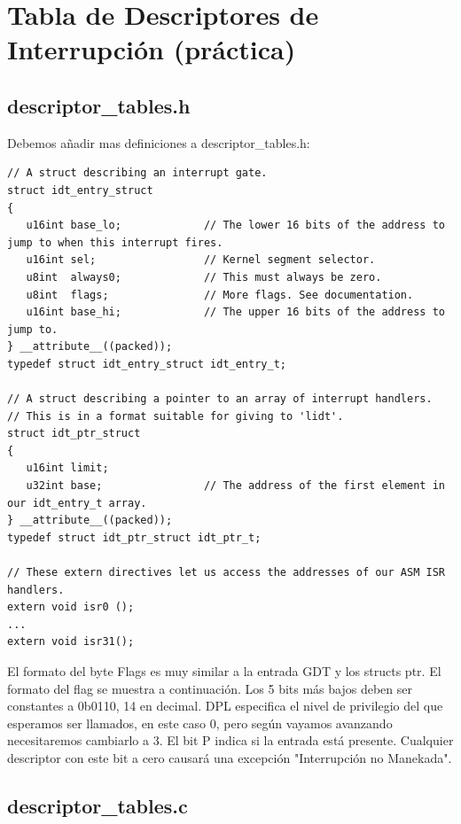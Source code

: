 \documentclass{report}
\begin{document}
\section{Tabla de Descriptores de Interrupción (práctica)}

\subsection{descriptor\_tables.h}

Debemos añadir mas definiciones a  descriptor\_tables.h:

\begin{lstlisting}
// A struct describing an interrupt gate.
struct idt_entry_struct
{
   u16int base_lo;             // The lower 16 bits of the address to jump to when this interrupt fires.
   u16int sel;                 // Kernel segment selector.
   u8int  always0;             // This must always be zero.
   u8int  flags;               // More flags. See documentation.
   u16int base_hi;             // The upper 16 bits of the address to jump to.
} __attribute__((packed));
typedef struct idt_entry_struct idt_entry_t;

// A struct describing a pointer to an array of interrupt handlers.
// This is in a format suitable for giving to 'lidt'.
struct idt_ptr_struct
{
   u16int limit;
   u32int base;                // The address of the first element in our idt_entry_t array.
} __attribute__((packed));
typedef struct idt_ptr_struct idt_ptr_t;

// These extern directives let us access the addresses of our ASM ISR handlers.
extern void isr0 ();
...
extern void isr31();
\end{lstlisting}

El formato del byte Flags es muy similar a la entrada GDT y los structs ptr. El formato del flag se muestra a continuación. Los 5 bits más bajos deben ser constantes a 0b0110, 14 en decimal. DPL especifica el nivel de privilegio del que esperamos ser llamados, en este caso 0, pero según vayamos avanzando necesitaremos cambiarlo a 3. El bit P indica si la entrada está presente. Cualquier descriptor con este bit a cero causará una excepción "Interrupción no Manekada".

\subsection{descriptor\_tables.c}
\end{document}
